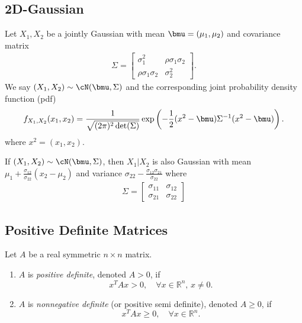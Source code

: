 \documentclass{article}
\begin{document}
\subsection{2D-Gaussian}
\begin{definition}
    Let $X_1, X_2$ be a jointly Gaussian with mean $\bmu=(\mu_1, \mu_2)$ and covariance matrix
    \begin{align}
        \Sigma = \begin{bmatrix}
            \sigma_1^2 &\rho \sigma_1\sigma_2\\
            \rho\sigma_1\sigma_2 & \sigma_2^2
        \end{bmatrix}.
    \end{align}
    We say $(X_1, X_2)\sim\cN({\bmu}, \Sigma)$ and the corresponding joint probability density function (pdf)
    \begin{align}
        f_{X_1, X_2}(x_1, x_2) = \frac{1}{\sqrt{(2\pi)^2 \det(\Sigma)}} \exp\left(-\frac{1}{2}(x^2-\bmu)\Sigma^{-1} (x^2-\bmu)\right).
    \end{align}
    where $x^2 = (x_1, x_2)$.
\end{definition}

\begin{theorem}
    If $(X_1, X_2)\sim \cN(\bmu, \Sigma)$, then $X_1|X_2$ is also Gaussian with mean $\mu_1 + \frac{\sigma_{12}}{\sigma_{22}}(x_2-\mu_2)$
    and variance $\sigma_{22} - \frac{\sigma_{12}\sigma_{21}}{\sigma_{22}}$ where 
    \begin{align}
        \Sigma = \begin{bmatrix}
            \sigma_{11} & 
            \sigma_{12} \\ 
            \sigma_{21} & 
            \sigma_{22}  
        \end{bmatrix}
    \end{align}
\end{theorem}



\subsection{Positive Definite Matrices}

\begin{definition}
Let $A$ be a real symmetric $n \times n$ matrix.
\begin{enumerate}
    \item $A$ is \emph{positive definite}, denoted $A > 0$, if
    \[
        x^{T} A x > 0, \quad \forall x \in \mathbb{R}^n, \, x \neq 0.
    \]
    \item $A$ is \emph{nonnegative definite} (or positive semi definite), denoted $A \ge 0$, if
    \[
        x^{T} A x \ge 0, \quad \forall x \in \mathbb{R}^n.
    \]
\end{enumerate}
\end{definition}
\end{document}
